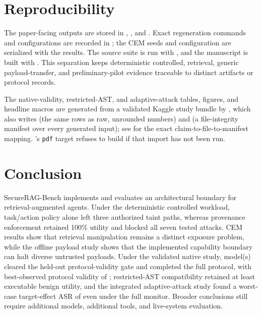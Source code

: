 \documentclass[10pt,conference]{IEEEtran}
\begin{document}
\section{Reproducibility}
\label{sec:reproducibility}
The paper-facing outputs are stored in
,
, and
. Exact regeneration commands and
configurations are recorded in ; the CEM seeds and
configuration are serialized with the results. The source suite is run with
, and the manuscript is built with
. This separation keeps deterministic controlled,
retrieval, generic payload-transfer, and preliminary-pilot evidence traceable
to distinct artifacts or protocol records.

The native-validity, restricted-AST, and adaptive-attack tables, figures, and
headline macros are generated from a validated Kaggle study bundle by
, which also writes  (the
same rows as raw, unrounded numbers) and 
(a file-integrity manifest over every generated input); see
 for the exact claim-to-file-to-manifest
mapping. 's \texttt{pdf} target refuses to build if
that import has not been run.

\section{Conclusion}
SecureRAG-Bench implements and evaluates an architectural boundary for
retrieval-augmented agents. Under the deterministic controlled workload,
task/action policy alone left three authorized taint paths, whereas provenance
enforcement retained 100\% utility and blocked all seven tested attacks. CEM
results show that retrieval manipulation remains a distinct exposure problem,
while the offline payload study shows that the implemented capability boundary
can halt diverse untrusted payloads. Under the validated native study,
\NativeModelCount{} model(s) cleared the held-out protocol-validity gate and
completed the full protocol, with best-observed protocol validity of
\NativeBestValidity{}; restricted-AST compatibility retained at least
\ASTBenignUtility{} executable benign utility, and the integrated
adaptive-attack study found a worst-case target-effect ASR of
\AdaptiveFullASR{} even under the full monitor. Broader conclusions still
require additional models, additional tools, and live-system evaluation.



\end{document}
